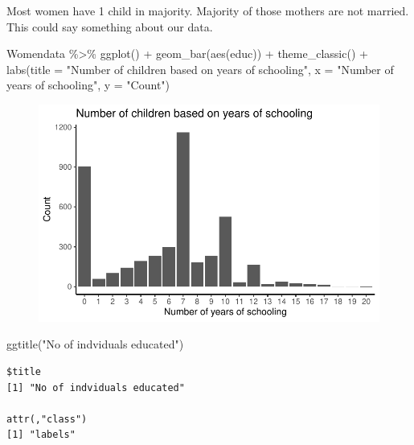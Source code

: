 \documentclass[
  letterpaper,
  DIV=11,
  numbers=noendperiod]{scrartcl}
\newenvironment{Shaded}{\begin{snugshade}}{\end{snugshade}}
\newcommand{\AttributeTok}[1]{\textcolor[rgb]{0.40,0.45,0.13}{#1}}
\newcommand{\FunctionTok}[1]{\textcolor[rgb]{0.28,0.35,0.67}{#1}}
\newcommand{\NormalTok}[1]{\textcolor[rgb]{0.00,0.23,0.31}{#1}}
\newcommand{\SpecialCharTok}[1]{\textcolor[rgb]{0.37,0.37,0.37}{#1}}
\newcommand{\StringTok}[1]{\textcolor[rgb]{0.13,0.47,0.30}{#1}}
\begin{document}
Most women have 1 child in majority. Majority of those mothers are not
married. This could say something about our data.

\begin{Shaded}
\begin{Highlighting}[]
\NormalTok{Womendata }\SpecialCharTok{\%\textgreater{}\%}
  \FunctionTok{ggplot}\NormalTok{() }\SpecialCharTok{+}
  \FunctionTok{geom\_bar}\NormalTok{(}\FunctionTok{aes}\NormalTok{(educ)) }\SpecialCharTok{+}
  \FunctionTok{theme\_classic}\NormalTok{() }\SpecialCharTok{+} \FunctionTok{labs}\NormalTok{(}\AttributeTok{title =} \StringTok{"Number of children based on years of schooling"}\NormalTok{,}
       \AttributeTok{x =} \StringTok{"Number of years of schooling"}\NormalTok{,}
       \AttributeTok{y =} \StringTok{"Count"}\NormalTok{)}
\end{Highlighting}
\end{Shaded}

\begin{figure}[H]

{\centering \includegraphics{Fertility_Rates_Education_Impact_Botswana_files/figure-pdf/unnamed-chunk-26-1.pdf}

}

\end{figure}

\begin{Shaded}
\begin{Highlighting}[]
  \FunctionTok{ggtitle}\NormalTok{(}\StringTok{"No of indviduals educated"}\NormalTok{)}
\end{Highlighting}
\end{Shaded}

\begin{verbatim}
$title
[1] "No of indviduals educated"

attr(,"class")
[1] "labels"
\end{verbatim}
\end{document}
